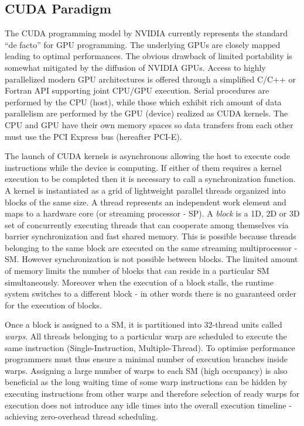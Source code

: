 \documentclass[1p]{elsarticle}
\begin{document}

\subsection{CUDA Paradigm} 
\label{sec:cuda}

The CUDA programming model \cite{cudaurl} by NVIDIA currently represents the standard ``de facto'' for GPU programming. The underlying GPUs are closely mapped leading to optimal performances. The obvious drawback of limited portability is somewhat mitigated by the diffusion of NVIDIA GPUs. Access to highly parallelized modern GPU architectures is offered through a simplified C/C++ or Fortran API supporting joint CPU/GPU execution. Serial procedures are performed by the CPU (host), while those which exhibit rich amount of data parallelism are performed by the GPU (device) realized as CUDA kernels. The CPU and GPU have their own memory spaces so data transfers from each other must use the PCI Express bus (hereafter PCI-E). 

The launch of CUDA kernels is asynchronous allowing the host to execute code instructions while the device is computing. If either of them requires a kernel execution to be completed then it is necessary to call a synchronization function. A kernel is instantiated as a grid of lightweight parallel threads organized into blocks of the same size. A thread represents an independent work element and maps to a hardware core (or streaming processor - SP). A {\em block} is a 1D, 2D or 3D set of concurrently executing threads that can cooperate among themselves via barrier synchronization and fast shared memory. This is possible because threads belonging to the same block are executed on the same streaming multiprocessor - SM. However synchronization is not possible between blocks. The limited amount of memory limits the number of  blocks that can reside in a particular SM simultaneously. Moreover when the execution of a block stalls, the runtime system switches to a different block - in other words there is no guaranteed order for the execution of blocks.

Once a block is assigned to a SM, it is partitioned into 32-thread units called {\em warps}. All threads belonging to a particular warp are scheduled to execute the same instruction (Single-Instruction, Multiple-Thread). To optimise performance programmers must thus ensure a minimal number of execution branches inside warps. Assigning a large number of warps to each SM (high occupancy) is also beneficial as the long waiting time of some warp instructions can be hidden by executing instructions from other warps and therefore selection of ready warps for execution does not introduce any idle times into the overall execution timeline - achieving zero-overhead thread scheduling. 
\end{document}
